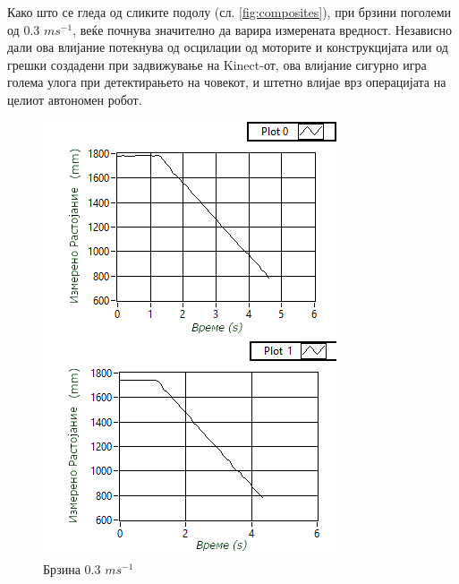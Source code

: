 \documentclass[11pt]{article}
\begin{document}
      Како што се гледа од сликите подолу (сл. \ref{fig:composites}), при брзини поголеми од 0.3 $ms^{-1}$, веќе почнува значително да варира измерената вредност. Независно дали ова влијание потекнува од  осцилации од моторите и конструкцијата или од грешки создадени при задвижување на Kinect-от, ова влијание сигурно игра голема улога при детектирањето на човекот, и штетно влијае врз операцијата на целиот автономен робот.

      \begin{figure}[H]
        \begin{minipage}{0.45\linewidth}
          \centering
          \includegraphics[width = \textwidth]{./images/speed_composite_03_mk.png}
          \caption{Брзина 0.3 $ms^{-1}$}
        \end{minipage}
        \begin{minipage}{0.45\linewidth}

\end{minipage}
\end{figure}
\end{document}
